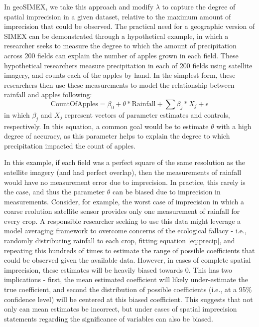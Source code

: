 \documentclass[11pt]{article}
\begin{document}
\par
In geoSIMEX, we take this approach and modify $\lambda$ to capture the degree of spatial imprecision in a given dataset, relative to the maximum amount of imprecision that could be observed.
The practical need for a geographic version of SIMEX can be demonstrated through a hypothetical example, in which a researcher seeks to measure the degree to which the amount of precipitation across 200 fields can explain the number of apples grown in each field.
These hypothetical researchers measure precipitation in each of 200 fields using satellite imagery, and counts each of the apples by hand.
In the simplest form, these researchers then use these measurements to model the relationship between rainfall and apples following:
\begin{equation}\label{eq:precip}
\text{CountOfApples} = \beta_{0} + \theta * \text{Rainfall} + \sum{\beta_{j} * X_{j}} + \epsilon
\end{equation}
\noindent in which $\beta_{j}$ and $X_{j}$ represent vectors of parameter estimates and controls, respectively. 
In this equation, a common goal would be to estimate $\theta$ with a high degree of accuracy, as this parameter helps to explain the degree to which precipitation impacted the count of apples.
\par
In this example, if each field was a perfect square of the same resolution as the satellite imagery (and had perfect overlap), then the measurements of rainfall would have no measurement error due to imprecision.
In practice, this rarely is the case, and thus the parameter $\theta$ can be biased due to imprecision in measurements.
Consider, for example, the worst case of imprecision in which a coarse reolution satellite sensor provides only one measurement of rainfall for every crop.
A responsible researcher seeking to use this data might leverage a model averaging framework to overcome concerns of the ecological fallacy - i.e., randomly distributing rainfall to each crop, fitting equation \ref{eq:precip}, and repeating this hundreds of times to estimate the range of possible coefficients that could be observed given the available data.
However, in cases of complete spatial imprecision, these estimates will be heavily biased towards 0.
This has two implications - first, the mean estimated coefficient will likely under-estimate the true coefficient, and second the distribution of possible coefficients (i.e., at a 95\% confidence level) will be centered at this biased coefficient.  
This suggests that not only can mean estimates be incorrect, but under cases of spatial imprecision statements regarding the significance of variables can also be biased.
\end{document}
